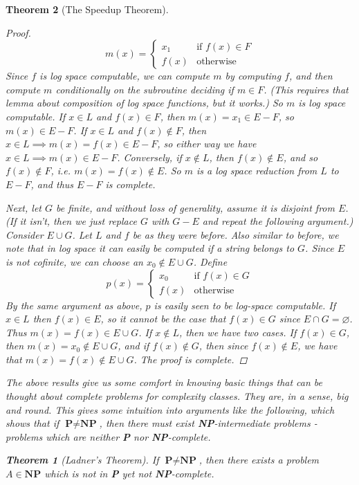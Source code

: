 \documentclass{article}
\theoremstyle{definition}
\theoremstyle{plain}
\theoremstyle{theorem}
\newtheorem{theorem}{Theorem}[section]
\begin{document}
\begin{theorem}[The Speedup Theorem]
\begin{proof}
	\[ m(x) = \begin{cases}
				x_1 & \textrm{if $f(x) \in F$} \\
				f(x) & \textrm{otherwise}
				\end{cases} \]
Since $f$ is log space computable, we can compute $m$ by computing $f$, and then compute $m$ conditionally on the subroutine deciding if $m \in F$. (This requires that lemma about composition of log space functions, but it works.) So $m$ is log space computable. If $x \in L$ and $f(x) \in F$, then $m(x) = x_1 \in E-F$, so $m(x) \in E-F$. If $x \in L$ and $f(x) \notin F$, then $x \in L \implies m(x) = f(x) \in E-F$, so either way we have $x \in L \implies m(x) \in E-F$. Conversely, if $x \notin L$, then $f(x) \notin E$, and so $f(x) \notin F$, i.e. $m(x) = f(x) \notin E$. So $m$ is a log space reduction from $L$ to $E-F$, and thus $E-F$ is complete.
\par Next, let $G$ be finite, and without loss of generality, assume it is disjoint from $E$. (If it isn't, then we just replace $G$ with $G-E$ and repeat the following argument.) Consider $E \cup G$. Let $L$ and $f$ be as they were before. Also similar to before, we note that in log space it can easily be computed if a string belongs to $G$. Since $E$ is not cofinite, we can choose an $x_0 \notin E \cup G$. Define 
\[ p(x) = \begin{cases}
			x_0 & \textrm{if $f(x) \in G$} \\
			f(x) & \textrm{otherwise}
\end{cases} \]   
By the same argument as above, $p$ is easily seen to be log-space computable. If $x \in L$ then $f(x) \in E$, so it cannot be the case that $f(x) \in G$ since $E \cap G = \varnothing$. Thus $m(x) = f(x) \in E \cup G$. If $x \notin L$, then we have two cases. If $f(x) \in G$, then $m(x) = x_0 \notin E \cup G$, and if $f(x) \notin G$, then since $f(x) \notin E$, we have that $m(x) = f(x) \notin E \cup G$. The proof is complete.
\end{proof}
\par The above results give us some comfort in knowing basic things that can be thought about complete problems for complexity classes. They are, in a sense, big and round. This gives some intuition into arguments like the following, which shows that if $\textbf{P} \neq \textbf{NP}$, then there must exist \textbf{NP}-intermediate problems - problems which are neither \textbf{P} nor \textbf{NP}-complete.
\begin{theorem}[Ladner's Theorem]
	If $\textbf{P} \neq \textbf{NP}$, then there exists a problem $A \in \textbf{NP}$ which is not in \textbf{P} yet not \textbf{NP}-complete.

\end{theorem}
\end{theorem}
\end{document}
